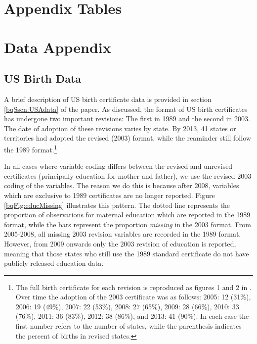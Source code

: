 \documentclass[a4paper, 12 pt]{article}
\theoremstyle{plain}
\begin{document}
\begin{doublespace}
\appendix
\section{Appendix Tables}


\clearpage
%


\section{Data Appendix}
\label{bqScn:datApp}
\subsection{US Birth Data}
A brief description of US birth certificate data is provided in section
\ref{bqSscn:USAdata} of the paper.  As discussed, the format of US birth
certificates has undergone two important revisions: The first in 1989
and the second in 2003.  The date of adoption of these revisions varies
by state.  By 2013, 41 states or territories had adopted the revised (2003)
format, while the reaminder still follow the 1989 format.\footnote{The full
birth certificate for each revision is reproduced as figures 1 and 2 in
\citet{MenackerMartin2005}.  Over time the adoption of the 2003 certificate
was as follows: 2005: 12 (31\%), 2006: 19 (49\%), 2007: 22 (53\%), 2008: 27
(65\%), 2009: 28 (66\%), 2010: 33 (76\%), 2011: 36 (83\%), 2012: 38 (86\%),
and 2013: 41 (90\%).  In each case the first number refers to the number
of states, while the parenthesis indicates the percent of births in revised
states.}

In all cases where variable coding differs between the revised and unrevised
certificates (principally education for mother and father), we use the revised
2003 coding of the variables.  The reason we do this is because after 2008,
variables which are exclusive to 1989 certificates are no longer reported.
Figure \ref{bqFig:educMissing} illustrates this pattern.  The dotted line
represents the proportion of observations for maternal education which are
reported in the 1989 format, while the bars represent the proportion
\emph{missing} in the 2003 format.  From 2005-2008, all missing 2003 revision
variables are recorded in the 1989 format.  However, from 2009 onwards only
the 2003 revision of education is reported, meaning that those states who
still use the 1989 standard certificate do not have publicly released education
data.  %





\end{doublespace}
\end{document}
